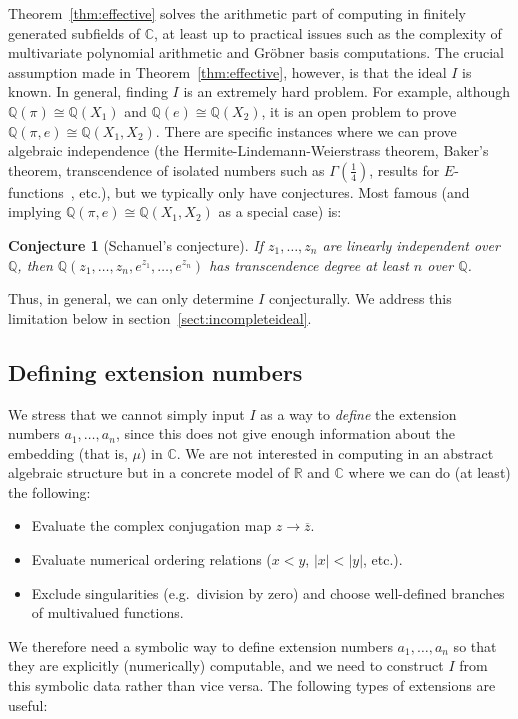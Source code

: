 \documentclass[11pt,a4paper]{article}
\newtheorem{conjecture}[theorem]{Conjecture}
\begin{document}
Theorem~\ref{thm:effective} solves the arithmetic part of computing in
finitely generated
subfields of $\mathbb{C}$, at least up to practical issues such as the complexity
of multivariate polynomial arithmetic and Gr\"{o}bner basis computations.
The crucial assumption made in Theorem~\ref{thm:effective}, however, is that
the ideal $I$ is known.
In general, finding $I$ is an extremely hard problem.
For example, although $\mathbb{Q}(\pi) \cong \mathbb{Q}(X_1)$
and $\mathbb{Q}(e) \cong \mathbb{Q}(X_2)$, it is an open
problem to prove $\mathbb{Q}(\pi,e) \cong \mathbb{Q}(X_1,X_2)$.
There are specific instances where we can prove algebraic
independence (the Hermite-Lindemann-Weierstrass theorem,
Baker's theorem, transcendence of isolated
numbers such as $\Gamma(\tfrac{1}{4})$, results
for $E$-functions~\cite{FR2019}, etc.), but we typically only
have conjectures. Most famous (and implying
$\mathbb{Q}(\pi,e) \cong \mathbb{Q}(X_1,X_2)$ as a special case) is:

\begin{conjecture}[Schanuel's conjecture]
If $z_1,\ldots,z_n$ are linearly independent over $\mathbb{Q}$,
then $\mathbb{Q}(z_1,\ldots,z_n,e^{z_1},\ldots,e^{z_n})$ has
transcendence degree at least $n$ over $\mathbb{Q}$.
\end{conjecture}

Thus, in general, we can only determine $I$ conjecturally.
We address this limitation below in section~\ref{sect:incompleteideal}.

\subsection{Defining extension numbers}

We stress that we cannot simply input $I$ as a way to \emph{define}
the extension numbers $a_1,\ldots,a_n$, since this does not
give enough information about the embedding (that is, $\mu$) in $\mathbb{C}$.
We are not interested in computing in an abstract algebraic
structure but in a concrete model of $\mathbb{R}$
and $\mathbb{C}$ where
we can do (at least) the following:
\begin{itemize}
\item Evaluate the complex conjugation map $z \to \overline{z}$.
\item Evaluate numerical ordering relations ($x < y$, $|x| < |y|$, etc.).
\item Exclude singularities (e.g.\ division by zero) and choose well-defined branches of multivalued functions.
\end{itemize}
We therefore need a symbolic way to define extension numbers
$a_1,\ldots,a_n$ so that they are explicitly (numerically) computable,
and we need to construct $I$ from this symbolic data
rather than vice versa.
The following types of extensions are useful:
\end{document}
